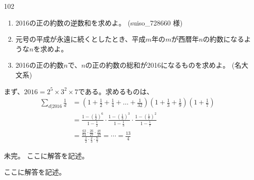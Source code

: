 \begin{prob}{102}{}{}
 \begin{enumerate}
  \item 2016の正の約数の逆数和を求めよ。  (suiso\_728660 様)
  \item 元号の平成が永遠に続くとしたとき、平成$m$年の$m$が西暦年$n$の約数になるような$n$を求めよ。 
  \item 2016の正の約数$n$で、$n$の正の約数の総和が2016になるものを求めよ。  (名大 文系)
 \end{enumerate}
\end{prob}
まず、$2016=2^5\times 3^2\times 7$である。求めるものは、
\begin{align*}
 \sum_{d|2016} \frac{1}{d} &= \left(1+\frac{1}{2}+\frac{1}{4}+\dots +\frac{1}{32}\right)\left(1+\frac{1}{3}+\frac{1}{9}\right)\left(1+\frac{1}{7}\right) \\
 &= \frac{1-\left(\frac{1}{2}\right)^6}{1-\frac{1}{2}}\cdot\frac{1-\left(\frac{1}{3}\right)^3}{1-\frac{1}{3}}\cdot\frac{1-\left(\frac{1}{7}\right)^2}{1-\frac{1}{7}} \\
 &= \frac{\frac{63}{64}\cdot\frac{26}{27}\cdot\frac{48}{49}}{\frac{1}{2}\cdot\frac{2}{3}\cdot\frac{6}{7}}=\cdots=\frac{13}{4}
\end{align*}

未完。
ここに解答を記述。

ここに解答を記述。
